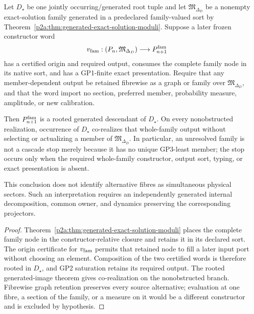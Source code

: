 \documentclass[12pt,a4paper]{article}
\begin{document}
\begin{corollary}
\label{p2a:cor:v173-whole-family-parent-reuse}
Let \(D_\star\) be one jointly occurring/generated root tuple and let
\(\mathfrak M_{\Delta_D}\) be a nonempty exact-solution family generated in a
predeclared family-valued sort by
Theorem~\ref{p2a:thm:generated-exact-solution-moduli}.  Suppose a later frozen
constructor word
\[
 v_{\rm fam}:
 (P_n,\mathfrak M_{\Delta_D})\longrightarrow P_{n+1}^{\rm fam}
\]
has a certified origin and required output, consumes the complete family node
in its native sort, and has a GP1-finite exact presentation.  Require that any
member-dependent output be retained fibrewise as a graph or family over
\(\mathfrak M_{\Delta_D}\), and that the word import no section, preferred
member, probability measure, amplitude, or new calibration.

Then \(P_{n+1}^{\rm fam}\) is a rooted generated descendant of \(D_\star\).
On every nonobstructed realization, occurrence of \(D_\star\) co-realizes that
whole-family output without selecting or actualizing a member of
\(\mathfrak M_{\Delta_D}\).  In particular, an unresolved family is not a
cascade stop merely because it has no unique GP3-least member; the stop occurs
only when the required whole-family constructor, output sort, typing, or exact
presentation is absent.

This conclusion does not identify alternative fibres as simultaneous physical
sectors.  Such an interpretation requires an independently generated internal
decomposition, common owner, and dynamics preserving the corresponding
projectors.
\end{corollary}

\begin{proof}
Theorem~\ref{p2a:thm:generated-exact-solution-moduli} places the complete
family node in the constructor-relative closure and retains it in its declared
sort.  The origin certificate for \(v_{\rm fam}\) permits that retained node to
fill a later input port without choosing an element.  Composition of the two
certified words is therefore rooted in \(D_\star\), and GP2 saturation retains
its required output.  The rooted generated-image theorem gives co-realization
on the nonobstructed branch.  Fibrewise graph retention preserves every source
alternative; evaluation at one fibre, a section of the family, or a measure on
it would be a different constructor and is excluded by hypothesis.
\end{proof}
\end{document}
